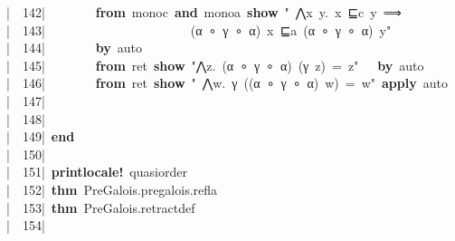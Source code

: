 \documentclass{article}
\newcommand{\syntaxKEYWORDA}[1]{\textcolor[rgb]{0.0,0.4,0.6}{\textbf{#1}}}
\newcommand{\syntaxKEYWORDB}[1]{\textcolor[rgb]{0.0,0.6,0.4}{\textbf{#1}}}
\newcommand{\syntaxKEYWORDC}[1]{\textcolor[rgb]{0.0,0.6,1.0}{\textbf{#1}}}
\newcommand{\syntaxLITERALA}[1]{\textcolor[rgb]{1.0,0.0,0.8}{#1}}
\newcommand{\syntaxOPERATOR}[1]{\textcolor[rgb]{0.0,0.0,0.0}{\textbf{#1}}}
\newcommand{\syntaxKEYWORDA}[1]{\textcolor[rgb]{0.0,0.4,0.6}{\textbf{#1}}}
\newcommand{\syntaxKEYWORDB}[1]{\textcolor[rgb]{0.0,0.6,0.4}{\textbf{#1}}}
\newcommand{\syntaxKEYWORDC}[1]{\textcolor[rgb]{0.0,0.6,1.0}{\textbf{#1}}}
\newcommand{\syntaxLITERALA}[1]{\textcolor[rgb]{1.0,0.0,0.8}{#1}}
\newcommand{\syntaxOPERATOR}[1]{\textcolor[rgb]{0.0,0.0,0.0}{\textbf{#1}}}
\newcommand{\syntaxKEYWORDA}[1]{\textcolor[rgb]{0.0,0.4,0.6}{\textbf{#1}}}
\newcommand{\syntaxKEYWORDB}[1]{\textcolor[rgb]{0.0,0.6,0.4}{\textbf{#1}}}
\newcommand{\syntaxKEYWORDC}[1]{\textcolor[rgb]{0.0,0.6,1.0}{\textbf{#1}}}
\newcommand{\syntaxLITERALA}[1]{\textcolor[rgb]{1.0,0.0,0.8}{#1}}
\newcommand{\syntaxOPERATOR}[1]{\textcolor[rgb]{0.0,0.0,0.0}{\textbf{#1}}}
\newcommand{\syntaxKEYWORDA}[1]{\textcolor[rgb]{0.0,0.4,0.6}{#1}}
\newcommand{\syntaxKEYWORDB}[1]{\textcolor[rgb]{0.0,0.6,0.4}{#1}}
\newcommand{\syntaxKEYWORDC}[1]{\textcolor[rgb]{0.0,0.6,1.0}{#1}}
\newcommand{\syntaxLITERALA}[1]{\textcolor[rgb]{1.0,0.0,0.8}{\textbf{#1}}}
\newcommand{\syntaxOPERATOR}[1]{\textcolor[rgb]{0.0,0.0,0.0}{#1}}
\newcommand{\syntaxKEYWORDA}[1]{\textcolor[rgb]{0.0,0.4,0.6}{\textbf{#1}}}
\newcommand{\syntaxKEYWORDB}[1]{\textcolor[rgb]{0.0,0.6,0.4}{\textbf{#1}}}
\newcommand{\syntaxKEYWORDC}[1]{\textcolor[rgb]{0.0,0.6,1.0}{\textbf{#1}}}
\newcommand{\syntaxLITERALA}[1]{\textcolor[rgb]{1.0,0.0,0.8}{#1}}
\newcommand{\syntaxOPERATOR}[1]{\textcolor[rgb]{0.0,0.0,0.0}{\textbf{#1}}}
\newcommand{\syntaxKEYWORDA}[1]{\textcolor[rgb]{0.0,0.4,0.6}{\textbf{#1}}}
\newcommand{\syntaxKEYWORDB}[1]{\textcolor[rgb]{0.0,0.6,0.4}{\textbf{#1}}}
\newcommand{\syntaxKEYWORDC}[1]{\textcolor[rgb]{0.0,0.6,1.0}{\textbf{#1}}}
\newcommand{\syntaxLITERALA}[1]{\textcolor[rgb]{1.0,0.0,0.8}{#1}}
\newcommand{\syntaxOPERATOR}[1]{\textcolor[rgb]{0.0,0.0,0.0}{\textbf{#1}}}
\newcommand{\syntaxKEYWORDA}[1]{\textcolor[rgb]{0.0,0.0,0.0}{#1}}
\newcommand{\syntaxKEYWORDB}[1]{\textcolor[rgb]{0.0,0.0,0.0}{#1}}
\newcommand{\syntaxKEYWORDC}[1]{\textcolor[rgb]{0.0,0.0,0.0}{#1}}
\newcommand{\gutter}[1]{\textcolor[rgb]{0,0,0}{{|}#1}}
\newcommand{\gutterH}[1]{\textcolor[rgb]{1,0,0}{{|}#1}}
\begin{document}
\gutter{\ \ 142{|}\ }{\ }{\ }{\ }{\ }{\ }{\ }{\ }\syntaxKEYWORDA{from}{\ }monoc{\ }\syntaxKEYWORDB{and}{\ }monoa{\ }\syntaxKEYWORDC{show}{\ }\syntaxLITERALA{"{\ }⋀x{\ }y.{\ }x{\ }⊑c{\ }y{\ }⟹}\hspace*{\fill}\\
\gutter{\ \ 143{|}\ }\syntaxLITERALA{{\ }{\ }{\ }{\ }{\ }{\ }{\ }{\ }{\ }{\ }{\ }{\ }{\ }{\ }{\ }{\ }{\ }{\ }{\ }{\ }{\ }{\ }(α{\ }∘{\ }γ{\ }∘{\ }α){\ }x{\ }⊑a{\ }(α{\ }∘{\ }γ{\ }∘{\ }α){\ }y"}{\ }{\ }\hspace*{\fill}\\
\gutter{\ \ 144{|}\ }{\ }{\ }{\ }{\ }{\ }{\ }{\ }\syntaxKEYWORDA{by}{\ }auto\hspace*{\fill}\\
\gutterH{\ \ 145{|}\ }{\ }{\ }{\ }{\ }{\ }{\ }{\ }\syntaxKEYWORDA{from}{\ }ret{\ }\syntaxKEYWORDC{show}{\ }\syntaxLITERALA{"⋀z.{\ }(α{\ }∘{\ }γ{\ }∘{\ }α){\ }(γ{\ }z){\ }={\ }z"}{\ }{\ }{\ }\syntaxKEYWORDA{by}{\ }auto\hspace*{\fill}\\
\gutter{\ \ 146{|}\ }{\ }{\ }{\ }{\ }{\ }{\ }{\ }\syntaxKEYWORDA{from}{\ }ret{\ }\syntaxKEYWORDC{show}{\ }\syntaxLITERALA{"{\ }⋀w.{\ }γ{\ }((α{\ }∘{\ }γ{\ }∘{\ }α){\ }w){\ }={\ }w"}{\ }\syntaxKEYWORDA{apply}{\ }auto\hspace*{\fill}\\
\gutter{\ \ 147{|}\ }{\ }{\ }{\ }{\ }{\ }{\ }{\ }\hspace*{\fill}\\
\gutter{\ \ 148{|}\ }{\ }{\ }{\ }{\ }{\ }{\ }\hspace*{\fill}\\
\gutter{\ \ 149{|}\ }\syntaxKEYWORDB{end}{\ }\hspace*{\fill}\\
\gutterH{\ \ 150{|}\ }\hspace*{\fill}\\
\gutter{\ \ 151{|}\ }\syntaxKEYWORDA{print\usebox{\underscorebox}locale}\syntaxOPERATOR{!}{\ }quasi\usebox{\underscorebox}order\hspace*{\fill}\\
\gutter{\ \ 152{|}\ }\syntaxKEYWORDA{thm}{\ }PreGalois.pre\usebox{\underscorebox}galois.refla\hspace*{\fill}\\
\gutter{\ \ 153{|}\ }\syntaxKEYWORDA{thm}{\ }PreGalois.retract\usebox{\underscorebox}def\hspace*{\fill}\\
\gutter{\ \ 154{|}\ }\hspace*{\fill}\\
\end{document}

